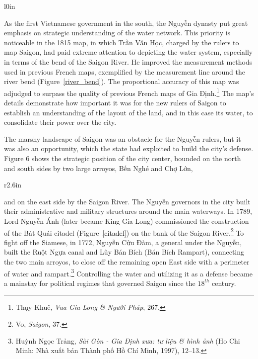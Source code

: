 \en
\begin{wrapfigure}{l}{0in}
\caption{The bend of the Saigon River depicted by \vi Trần Văn Học}
\label{river_bend}
\end{wrapfigure}
As the first Vietnamese government in the south, the \vi Nguyễn dynasty put great emphasis on strategic understanding of the water network. This priority is noticeable in the 1815 map, in which Trần Văn Học, charged by the rulers to map Saigon, had paid extreme attention to depicting the water system, especially in terms of the bend of the Saigon River. He improved the measurement methods used in previous French maps, exemplified by the measurement line around the river bend (Figure~\ref{river_bend}). The proportional accuracy of this map was adjudged to surpass the quality of previous French maps of Gia Định.\footnote{Thụy Khuê, \textit{Vua Gia Long \& Người Pháp}, 267.} The map’s details demonstrate how important it was for the new rulers of Saigon to establish an understanding of the layout of the land, and in this case its water, to consolidate their power over the city.

The marshy landscape of Saigon was an obstacle for the \vi Nguyễn rulers, but it was also an opportunity, which the state had exploited to build the city’s defense. Figure 6 shows the strategic position of the city center, bounded on the north and south sides by two large arroyos, Bến Nghé and Chợ Lớn,
\en
\begin{wrapfigure}{r}{2.6in}
\caption{The \vi Bát Quái citadel}
\label{citadel}
\end{wrapfigure}
and on the east side by the Saigon River. The \vi Nguyễn governors in the city built their administrative and military structures around the main waterways. In 1789, Lord \vi Nguyễn Ánh (later became King Gia Long) commissioned the construction of the Bát Quái citadel (Figure~\ref{citadel}) on the bank of the Saigon River.\footnote{Vo, \textit{Saigon}, 37.} To fight off the Siamese, in 1772, Nguyễn Cửu Đàm, a general under the Nguyễn, built the Ruột Ngựa canal and Lũy Bán Bích (Bán Bích Rampart), connecting the two main arroyos, to close off the remaining open East side with a perimeter of water and rampart.\footnote{Huỳnh Ngọc Trảng, \textit{Sài Gòn - Gia Định xưa: tư liệu \& hình ảnh} (Ho Chi Minh: Nhà xuất bản Thành phố Hồ Chí Minh, 1997), 12–13.} Controlling the water and utilizing it as a defense became a mainstay for political regimes that governed Saigon since the $18^{th}$ century.

